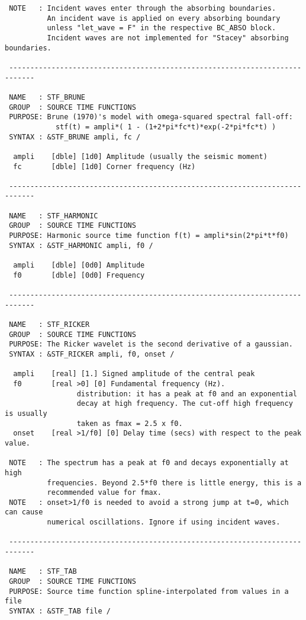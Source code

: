 \begin{verbatim}
 NOTE   : Incident waves enter through the absorbing boundaries.
          An incident wave is applied on every absorbing boundary
          unless "let_wave = F" in the respective BC_ABSO block.
          Incident waves are not implemented for "Stacey" absorbing boundaries.

 ----------------------------------------------------------------------------

 NAME   : STF_BRUNE
 GROUP  : SOURCE TIME FUNCTIONS
 PURPOSE: Brune (1970)'s model with omega-squared spectral fall-off:
            stf(t) = ampli*( 1 - (1+2*pi*fc*t)*exp(-2*pi*fc*t) )
 SYNTAX : &STF_BRUNE ampli, fc /

  ampli    [dble] [1d0] Amplitude (usually the seismic moment)
  fc       [dble] [1d0] Corner frequency (Hz)

 ----------------------------------------------------------------------------

 NAME   : STF_HARMONIC
 GROUP  : SOURCE TIME FUNCTIONS
 PURPOSE: Harmonic source time function f(t) = ampli*sin(2*pi*t*f0)
 SYNTAX : &STF_HARMONIC ampli, f0 /

  ampli    [dble] [0d0] Amplitude
  f0       [dble] [0d0] Frequency

 ----------------------------------------------------------------------------

 NAME   : STF_RICKER
 GROUP  : SOURCE TIME FUNCTIONS
 PURPOSE: The Ricker wavelet is the second derivative of a gaussian.
 SYNTAX : &STF_RICKER ampli, f0, onset /

  ampli    [real] [1.] Signed amplitude of the central peak
  f0       [real >0] [0] Fundamental frequency (Hz).
                 distribution: it has a peak at f0 and an exponential
                 decay at high frequency. The cut-off high frequency is usually
                 taken as fmax = 2.5 x f0. 
  onset    [real >1/f0] [0] Delay time (secs) with respect to the peak value. 

 NOTE   : The spectrum has a peak at f0 and decays exponentially at high 
          frequencies. Beyond 2.5*f0 there is little energy, this is a 
          recommended value for fmax.
 NOTE   : onset>1/f0 is needed to avoid a strong jump at t=0, which can cause
          numerical oscillations. Ignore if using incident waves.

 ----------------------------------------------------------------------------

 NAME   : STF_TAB
 GROUP  : SOURCE TIME FUNCTIONS
 PURPOSE: Source time function spline-interpolated from values in a file 
 SYNTAX : &STF_TAB file /


\end{verbatim}
